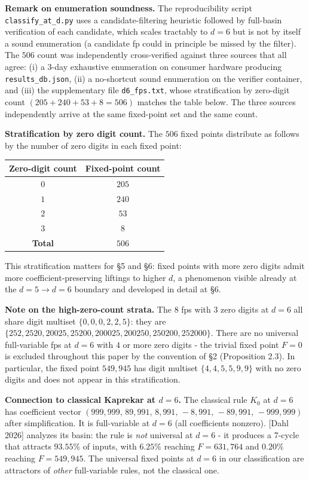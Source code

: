 \documentclass[11pt,letterpaper]{article}
\theoremstyle{paperstyle}
\theoremstyle{paperstyledef}
\theoremstyle{paperstylerem}
\begin{document}
\textbf{Remark on enumeration soundness.} The reproducibility script
\texttt{classify\_at\_d.py} uses a candidate-filtering heuristic
followed by full-basin verification of each candidate, which scales
tractably to \(d = 6\) but is not by itself a sound enumeration (a
candidate fp could in principle be missed by the filter). The \(506\)
count was independently cross-verified against three sources that all
agree: (i) a 3-day exhaustive enumeration on consumer hardware producing
\texttt{results\_db.json}, (ii) a no-shortcut sound enumeration on the
verifier container, and (iii) the supplementary file
\texttt{d6\_fps.txt}, whose stratification by zero-digit count
\((205 + 240 + 53 + 8 = 506)\) matches the table below. The three
sources independently arrive at the same fixed-point set and the same
count.

\textbf{Stratification by zero digit count.} The \(506\) fixed points
distribute as follows by the number of zero digits in each fixed point:

\begin{longtable}[]{@{}cc@{}}
\toprule\noalign{}
Zero-digit count & Fixed-point count \\
\midrule\noalign{}
\endhead
\bottomrule\noalign{}
\endlastfoot
\(0\) & \(205\) \\
\(1\) & \(240\) \\
\(2\) & \(53\) \\
\(3\) & \(8\) \\
\textbf{Total} & \textbf{\(506\)} \\
\end{longtable}

This stratification matters for §5 and §6: fixed points with more zero
digits admit more coefficient-preserving liftings to higher \(d\), a
phenomenon visible already at the \(d = 5 \to d = 6\) boundary and
developed in detail at §6.

\textbf{Note on the high-zero-count strata.} The \(8\) fps with \(3\)
zero digits at \(d = 6\) all share digit multiset
\(\{0, 0, 0, 2, 2, 5\}\): they are
\(\{252, 2520, 20025, 25200, 200025, 200250, 250200, 252000\}\). There
are no universal full-variable fps at \(d = 6\) with \(4\) or more zero
digits - the trivial fixed point \(F = 0\) is excluded throughout this
paper by the convention of §2 (Proposition 2.3). In particular, the
fixed point \(549{,}945\) has digit multiset \(\{4, 4, 5, 5, 9, 9\}\)
with no zero digits and does not appear in this stratification.

\textbf{Connection to classical Kaprekar at \(d = 6\).} The classical
rule \(K_0\) at \(d = 6\) has coefficient vector
\((999{,}999, \, 89{,}991, \, 8{,}991, \, -8{,}991, \, -89{,}991, \, -999{,}999)\)
after simplification. It is full-variable at \(d = 6\) (all coefficients
nonzero). {[}Dahl 2026{]} analyzes its basin: the rule is \emph{not}
universal at \(d = 6\) - it produces a 7-cycle that attracts
\(93.55\%\) of inputs, with \(6.25\%\) reaching \(F = 631{,}764\) and
\(0.20\%\) reaching \(F = 549{,}945\). The universal fixed points at
\(d = 6\) in our classification are attractors of \emph{other}
full-variable rules, not the classical one.
\end{document}
